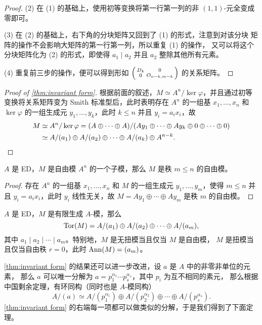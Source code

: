 \begin{proof}
  (2) 在 (1) 的基础上，使用初等变换将第一行第一列的非 $(1,1)$-元全变成零即可。

  (3) 在 (2) 的基础上，右下角的分块矩阵又回到了 (1) 的形式，注意到对该分块
  矩阵的操作不会影响大矩阵的第一行第一列，所以重复 (1) 的操作，
  又可以将这个分块矩阵化为 (2) 的形式，即使得 $a_1\mid a_2$ 并且 $a_2$ 整除其他所有元素。

  (4) 重复前三步的操作，便可以得到形如
  $
  \begin{psmallmatrix}
    D_k & 0 \\ 0 & O_{n-k,m-k}
  \end{psmallmatrix}
  $
  的关系矩阵。
\end{proof}

\begin{proof}[Proof of \ref{thm:invariant form}]
  根据前面的叙述，$M\simeq A^n/\ker\varphi$，并且通过初等变换将关系矩阵变为
  Smith 标准型后，此时表明存在 $A^n$ 的一组基 $x_1,\dots,x_n$ 和 $\ker\varphi$ 的一组生成元
  $y_1,\dots,y_k$，此时 $k\leq n$ 并且 $y_i=a_ix_i$，故
  \begin{align*}
    M&\simeq A^n/\ker\varphi
    =(A\oplus\cdots\oplus A)/(Ay_1\oplus \cdots\oplus Ay_k\oplus 0\oplus\cdots \oplus0)\\
    &\simeq A/(a_1)\oplus A/(a_2)\oplus\cdots\oplus A/(a_k)\oplus A^{n-k}  .
    \qedhere
  \end{align*}
\end{proof}

\begin{corollary}
  $A$ 是 ED，$M$ 是自由模 $A^n$ 的一个子模，那么 $M$ 是秩 $m\leq n$ 的自由模。
\end{corollary}
\begin{proof}
  存在 $A^n$ 的一组基 $x_1,\dots,x_n$ 和 $M$ 的一组生成元
  $y_1,\dots,y_m$，使得 $m\leq n$ 并且 $y_i=a_ix_i$，此时 $y_i$ 线性无关，故
  $M=Ay_1\oplus\cdots\oplus Ay_m$ 是秩 $m$ 的自由模。
\end{proof}

\begin{corollary}
  $A$ 是 ED，$M$ 是有限生成 $A$-模，那么
  \[
    \operatorname{Tor}(M)=A/(a_1)\oplus A/(a_2)\oplus\cdots\oplus A/(a_m),
  \]
  其中 $a_1\mid a_2\mid\cdots\mid a_m$。特别地，$M$ 是无扭模当且仅当 $M$ 是自由模，
  $M$ 是扭模当且仅当自由秩 $r=0$，此时 $\operatorname{Ann}(M)=(a_m)$。
\end{corollary}

\autoref{thm:invariant form} 的结果还可以进一步改进，设 $a$ 是 $A$ 中的非零非单位的元素，
那么 $a$ 可以唯一分解为 $a=p_1^{\alpha_1}\cdots p_s^{\alpha_s}$，其中 $p_i$ 为互不相同的素元，
那么根据中国剩余定理，有环同构（同时也是 $A$-模同构）
\[
  A/(a)\simeq A/(p_1^{\alpha_1})  \oplus A/(p_2^{\alpha_2})\oplus\cdots\oplus A/(p_s^{\alpha_s}).
\]
\autoref{thm:invariant form} 的右端每一项都可以做类似的分解，于是我们得到了下面定理。

